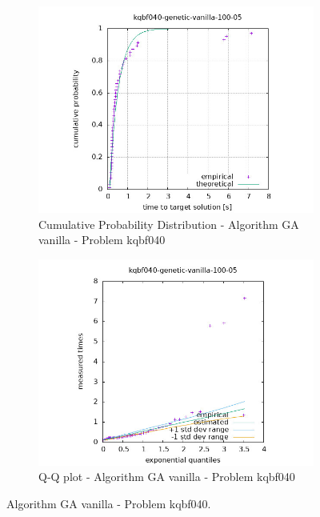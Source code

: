 \begin{figure}[H]
    \centering
    \begin{subfigure}{0.49\textwidth}
        \includegraphics[width=\textwidth]{figure/ttt_plot/kqbf040-genetic-vanilla-100-05-exp.jpeg}
        \caption{Cumulative Probability Distribution - Algorithm GA vanilla - Problem kqbf040}
        \label{fig:ga-vanilla-kqbf040-exp}
    \end{subfigure}
    \hfill
    \begin{subfigure}{0.49\textwidth}
        \includegraphics[width=\textwidth]{figure/ttt_plot/kqbf040-genetic-vanilla-100-05-qq.jpeg}
        \caption{Q-Q plot - Algorithm GA vanilla - Problem kqbf040}
        \label{fig:ga-vanilla-kqbf040-qq}
    \end{subfigure}
    \caption{Algorithm GA vanilla - Problem kqbf040.}
    \label{fig:ga-vanilla-kqbf040}
\end{figure}


